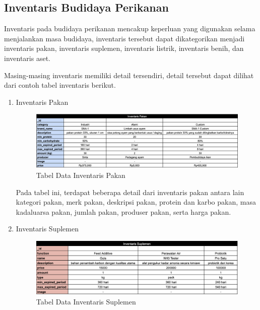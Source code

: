 \begin{spacing}{1.5}

\section{Inventaris Budidaya Perikanan}

Inventaris pada budidaya perikanan mencakup keperluan yang digunakan selama menjalankan masa budidaya, inventaris tersebut dapat dikategorikan menjadi inventaris pakan, inventaris suplemen, inventaris listrik, inventaris benih, dan inventaris aset.

Masing-masing inventaris memiliki detail tersendiri, detail tersebut dapat dilihat dari contoh tabel inventaris berikut.


\begin{enumerate}
	\item Inventaris Pakan
	
	\begin{figure}[H]
		\centering
		\includegraphics[width=1\textwidth]{gambar/tabel_inventaris_pakan.png}
		\caption{Tabel Data Inventaris Pakan}
	\end{figure}	

	Pada tabel ini, terdapat beberapa detail dari inventaris pakan antara lain kategori pakan, merk pakan, deskripsi pakan, protein dan karbo pakan, masa kadaluarsa pakan, jumlah pakan, produser pakan, serta harga pakan.

	\hfill \break
	\hfill \break
	\hfill \break
	\hfill \break


	\item Inventaris Suplemen
	
	\begin{figure}[H]
		\centering
		\includegraphics[width=1\textwidth]{gambar/tabel_inventaris_suplemen.png}
		\caption{Tabel Data Inventaris Suplemen}
	\end{figure}


\end{enumerate}
\end{spacing}
